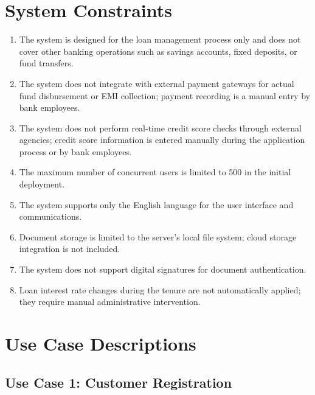 \documentclass[12pt,a4paper,oneside]{report}
\begin{document}
\section{System Constraints}

\begin{enumerate}
  \item The system is designed for the loan management process only and does not cover other banking operations such as savings accounts, fixed deposits, or fund transfers.
  \item The system does not integrate with external payment gateways for actual fund disbursement or EMI collection; payment recording is a manual entry by bank employees.
  \item The system does not perform real-time credit score checks through external agencies; credit score information is entered manually during the application process or by bank employees.
  \item The maximum number of concurrent users is limited to 500 in the initial deployment.
  \item The system supports only the English language for the user interface and communications.
  \item Document storage is limited to the server's local file system; cloud storage integration is not included.
  \item The system does not support digital signatures for document authentication.
  \item Loan interest rate changes during the tenure are not automatically applied; they require manual administrative intervention.
\end{enumerate}

\section{Use Case Descriptions}

\subsection{Use Case 1: Customer Registration}
\end{document}
